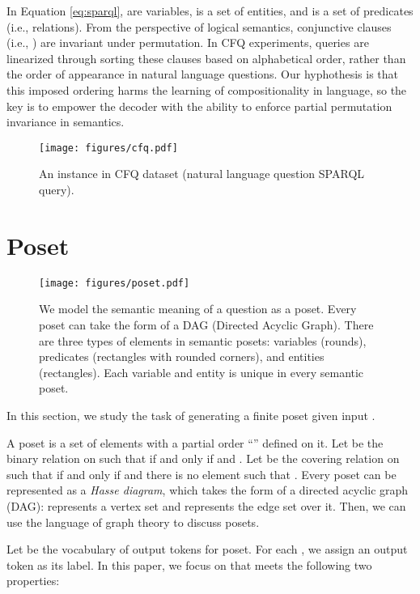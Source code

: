 \documentclass{article}
\begin{document}
In Equation \ref{eq:sparql},  are variables,  is a set of entities, and  is a set of predicates (i.e., relations).
From the perspective of logical semantics, conjunctive clauses (i.e., ) are invariant under permutation.
In CFQ experiments, queries are linearized through sorting these clauses based on alphabetical order, rather than the order of appearance in natural language questions.
Our hyphothesis is that this imposed ordering harms the learning of compositionality in language, so the key is to empower the decoder with the ability to enforce partial permutation invariance in semantics.



\begin{figure}
\small
\centering
\texttt{[image: figures/cfq.pdf]}
\caption{An instance in CFQ dataset (natural language question  SPARQL query).}
\label{fig:cfq}
\end{figure}

\section{Poset}

\begin{figure}
\small
\centering
\texttt{[image: figures/poset.pdf]}
\caption{We model the semantic meaning of a question as a poset.
Every poset can take the form of a DAG (Directed Acyclic Graph).
There are three types of elements in semantic posets: variables (rounds), predicates (rectangles with rounded corners), and entities (rectangles).
Each variable and entity is unique in every semantic poset.}
\label{fig:poset}
\end{figure}

In this section, we study the task of generating a finite poset  given input .

A poset  is a set of elements  with a partial order ``'' defined on it.
Let  be the binary relation on  such that  if and only if  and .
Let  be the covering relation on  such that  if and only if  and there is no element  such that .
Every poset can be represented as a \emph{Hasse diagram}, which takes the form of a directed acyclic graph (DAG):
 represents a vertex set and  represents the edge set over it.
Then, we can use the language of graph theory to discuss posets.



Let  be the vocabulary of output tokens for poset.
For each , we assign an output token  as its label.
In this paper, we focus on  that meets the following two properties:
\end{document}
